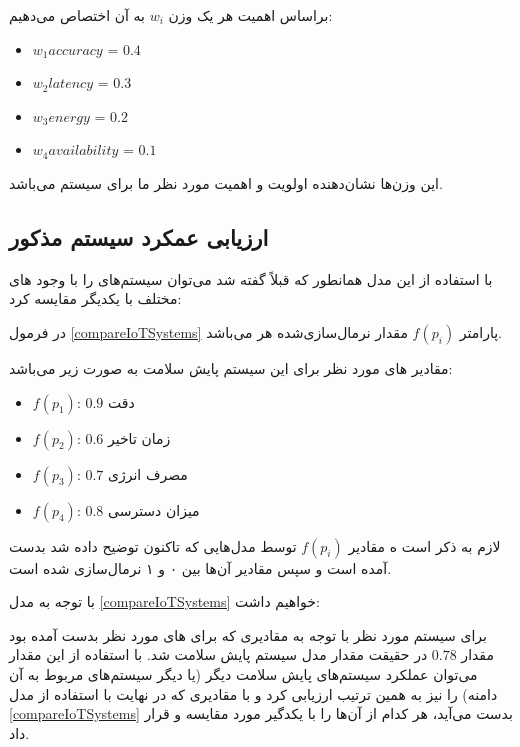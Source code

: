 \documentclass[a4paper]{article}
\begin{document}
براساس اهمیت هر  یک وزن $w_i$ به آن اختصاص می‌دهیم:

\begin{LTR}
    \begin{itemize}
        \item $w_1{accuracy}$ = $0.4$
        \item $w_2{latency}$ = $0.3$
        \item $w_3{energy}$ = $0.2$
        \item $w_4{availability}$ = $0.1$
    \end{itemize}
\end{LTR}

این وزن‌ها نشان‌دهنده اولویت و اهمیت  مورد نظر ما برای سیستم 
می‌باشد.

\subsection*{ارزیابی عمکرد سیستم مذکور}

با استفاده از این مدل همانطور که قبلاً گفته شد می‌توان سیستم‌های  را با
وجود های مختلف با یکدیگر مقایسه کرد:

در فرمول \ref{compareIoTSystems} پارامتر $f(p_i)$ مقدار نرمال‌سازی‌شده هر
 می‌باشد.

مقادیر های مورد نظر برای این سیستم پایش سلامت به صورت زیر می‌باشد: 

\begin{itemize}
    \item $f(p_1)$: $0.9$ دقت
    \item $f(p_2)$: $0.6$ زمان تاخیر
    \item $f(p_3)$: $0.7$ مصرف انرژی
    \item $f(p_4)$: $0.8$ میزان دسترسی
\end{itemize}

لازم به ذکر است ه مقادیر $f(p_i)$ توسط مدل‌هایی که تاکنون توضیح داده شد بدست
آمده است و سپس مقادیر آن‌ها بین ۰ و ۱ نرمال‌سازی شده است.

با توجه به مدل \ref{compareIoTSystems} خواهیم داشت:


برای سیستم مورد نظر با توجه به مقادیری که برای های مورد نظر بدست آمده
بود مقدار $0.78$ در حقیقت مقدار مدل سیستم پایش سلامت شد. با استفاده از این مقدار
می‌توان عملکرد سیستم‌های پایش سلامت دیگر (یا دیگر سیستم‌های  مربوط به آن
دامنه) را نیز به همین ترتیب ارزیابی کرد و با مقادیری که در نهایت با استفاده از
مدل \ref{compareIoTSystems} بدست می‌آید، هر کدام از آن‌ها را با یکدگیر مورد
مقایسه و  قرار داد.
\end{document}
